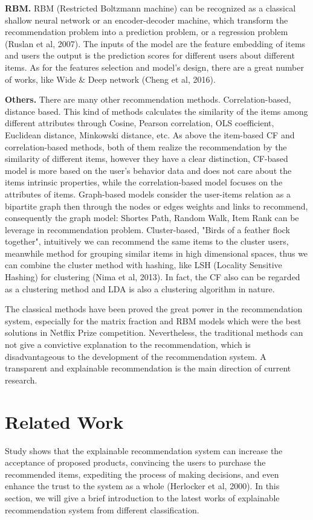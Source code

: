 \documentclass[10pt,twocolumn,letterpaper]{article}
\begin{document}
{\bf RBM.} RBM (Restricted Boltzmann machine) can be recognized as a classical shallow neural network or an encoder-decoder machine, which transform the recommendation problem into a prediction problem, or a regression problem (Ruslan et al, 2007). The inputs of the model are the feature embedding of items and users the output is the prediction scores for different users about different items. As for the features selection and model's design, there are a great number of works, like Wide $\&$ Deep network (Cheng et al, 2016). 

{\bf Others.} There are many other recommendation methods. Correlation-based, distance based. This kind of methods calculates the similarity of the items among different attributes through Cosine, Pearson correlation, OLS coefficient, Euclidean distance, Minkowski distance, etc. As above the item-based CF and correlation-based methods, both of them realize the recommendation by the similarity of different items, however they have a clear distinction, CF-based model is more based on the user's behavior data and does not care about the items intrinsic properties, while the correlation-based model focuses on the attributes of items. Graph-based models consider the user-items relation as a bipartite graph then through the nodes or edges weights and links to recommend, consequently the graph model: Shortes Path, Random Walk, Item Rank can be leverage in recommendation problem. Cluster-based, "Birds of a feather flock together", intuitively we can recommend the same items to the cluster users, meanwhile method for grouping similar items in high dimensional spaces, thus we can combine the cluster method with hashing, like LSH (Locality Sensitive Hashing) for clustering (Nima et al, 2013). In fact, the CF also can be regarded as a clustering method and LDA is also a clustering algorithm in nature.

The classical methods have been proved the great power in the recommendation system, especially for the matrix fraction and RBM models which were the best solutions in Netflix Prize competition. Nevertheless, the traditional methods can not give a convictive explanation to the recommendation, which is disadvantageous to the development of the recommendation system. A transparent and explainable recommendation is the main direction of current research.

\section{Related Work}
Study shows that the explainable recommendation system can increase the acceptance of proposed products, convincing the users to purchase the recommended items, expediting the process of making decisions, and even enhance the trust to the system as a whole (Herlocker et al, 2000). In this section, we will give a brief introduction to the latest works of explainable recommendation system from different classification.
\end{document}
